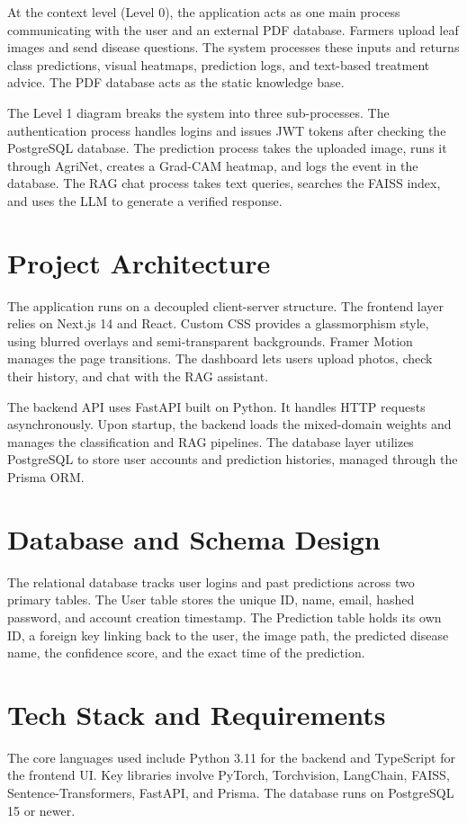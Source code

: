 \documentclass[12pt, a4paper]{report}
\begin{document}
At the context level (Level 0), the application acts as one main process communicating with the user and an external PDF database. Farmers upload leaf images and send disease questions. The system processes these inputs and returns class predictions, visual heatmaps, prediction logs, and text-based treatment advice. The PDF database acts as the static knowledge base.

The Level 1 diagram breaks the system into three sub-processes. The authentication process handles logins and issues JWT tokens after checking the PostgreSQL database. The prediction process takes the uploaded image, runs it through AgriNet, creates a Grad-CAM heatmap, and logs the event in the database. The RAG chat process takes text queries, searches the FAISS index, and uses the LLM to generate a verified response.

\section{Project Architecture}
The application runs on a decoupled client-server structure. The frontend layer relies on Next.js 14 and React. Custom CSS provides a glassmorphism style, using blurred overlays and semi-transparent backgrounds. Framer Motion manages the page transitions. The dashboard lets users upload photos, check their history, and chat with the RAG assistant.

The backend API uses FastAPI built on Python. It handles HTTP requests asynchronously. Upon startup, the backend loads the mixed-domain weights and manages the classification and RAG pipelines. The database layer utilizes PostgreSQL to store user accounts and prediction histories, managed through the Prisma ORM.

\section{Database and Schema Design}
The relational database tracks user logins and past predictions across two primary tables. The User table stores the unique ID, name, email, hashed password, and account creation timestamp. The Prediction table holds its own ID, a foreign key linking back to the user, the image path, the predicted disease name, the confidence score, and the exact time of the prediction.

\section{Tech Stack and Requirements}
The core languages used include Python 3.11 for the backend and TypeScript for the frontend UI. Key libraries involve PyTorch, Torchvision, LangChain, FAISS, Sentence-Transformers, FastAPI, and Prisma. The database runs on PostgreSQL 15 or newer.
\end{document}
